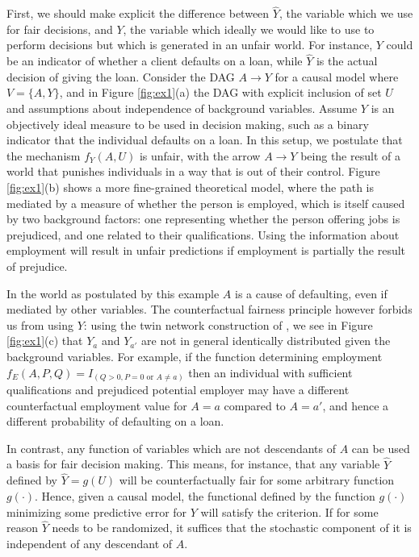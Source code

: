 First, we should make explicit the difference between $\hat Y$, the
variable which we use for fair decisions, and $Y$, the variable which
ideally we would like to use to perform decisions but which is
generated in an unfair world. For instance, $Y$
could be an indicator of whether a client defaults on a loan, while
$\hat Y$ is the actual decision of giving the
loan. Consider the DAG $A \rightarrow Y$ for a causal model where $V =
\{A, Y\}$, and in Figure \ref{fig:ex1}(a) the DAG with explicit
inclusion of set $U$ and assumptions about independence of background
variables. Assume $Y$ is an objectively ideal measure to be used in
decision making, such as a binary indicator that the individual
defaults on a loan. In this setup, we postulate that the mechanism
$f_Y(A, U)$ is unfair, with the arrow $A \rightarrow Y$ being the
result of a world that punishes individuals in a way that is out of
their control. Figure \ref{fig:ex1}(b) shows a more fine-grained
theoretical model, where the path is mediated by a measure of
whether the person is employed, which is itself caused by
two background factors: one representing whether the person offering jobs is
prejudiced, and one related to their qualifications. Using
the information about employment will result in unfair predictions
if employment is partially the result of prejudice.

In the world as postulated by this example 
$A$ is a cause of defaulting, even if mediated by other
variables. The counterfactual fairness principle however forbids us
from using $Y$: using the twin network construction of
\citet{pearl:00}, we see in Figure \ref{fig:ex1}(c) that $Y_a$ and
$Y_{a'}$ are not in general identically distributed given the
background variables.
For example, if the function determining employment
$f_E(A,P,Q) = I_{(Q > 0, P = 0 \text{ or } A \neq a)}$ then an individual
with sufficient qualifications and prejudiced potential employer
may have a different counterfactual
employment value for $A = a$ compared to $A = a'$, and hence a
different probability of defaulting on a loan.


In contrast, any function of variables which are not descendants of
$A$ can be used a basis for fair decision making. This means, for instance,
that any variable $\hat Y$ defined by $\hat Y = g(U)$ will be counterfactually
fair for some arbitrary function $g(\cdot)$. Hence, given a causal
model, the functional defined by the function $g(\cdot)$ 
minimizing some predictive error for $Y$ will satisfy the criterion.
If for some reason $\hat Y$ needs to be randomized, it suffices that the
stochastic component of it is independent of any descendant of $A$.

